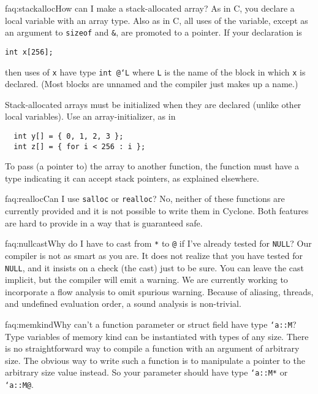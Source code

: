 \begin{faqa}{faq:stackalloc}{How can I make a stack-allocated array?}
As in C, you declare a local variable with an array type.  Also as in
C, all uses of the variable, except as an argument to \texttt{sizeof}
and \texttt{\&}, are promoted to a pointer.  If your declaration is
\begin{verbatim}
int x[256];
\end{verbatim}
then uses of \texttt{x} have type \texttt{int @`L\rb} where
\texttt{L} is the name of the block in which \texttt{x} is declared.
(Most blocks are unnamed and the compiler just makes up a name.)

Stack-allocated arrays must be initialized when they are declared
(unlike other local variables).  Use an array-initializer, as in
\begin{verbatim}
  int y[] = { 0, 1, 2, 3 };
  int z[] = { for i < 256 : i };
\end{verbatim}

To pass (a pointer to) the array to another function, the function
must have a type indicating it can accept stack pointers, as explained
elsewhere.
\end{faqa}

\begin{faqa}{faq:realloc}{Can I use \texttt{salloc} or \texttt{realloc}?}
No, neither of these functions are currently provided and it is not
possible to write them in Cyclone.  Both features are hard to provide
in a way that is guaranteed safe.
\end{faqa}

\begin{faqa}{faq:nullcast}{Why do I have to cast from \texttt{*} to \texttt{@} if I've already tested for \texttt{NULL}?} 
Our compiler is not as smart as you are.  It does not realize that you
have tested for \texttt{NULL}, and it insists on a check (the cast)
just to be sure.  You can leave the cast implicit, but the compiler
will emit a warning.  We are currently working to incorporate a flow
analysis to omit spurious warning.  Because of aliasing, threads, and 
undefined evaluation order, a sound analysis is non-trivial.
\end{faqa}

\begin{faqa}{faq:memkind}{Why can't a function parameter or struct field have type \texttt{`a::M}?} 
Type variables of memory kind can be instantiated with types of any
size.  There is no straightforward way to compile a function with an
argument of arbitrary size.  The obvious way to write such a function
is to manipulate a pointer to the arbitrary size value instead.  So
your parameter should have type \texttt{`a::M*} or \texttt{`a::M@}.
\end{faqa}

